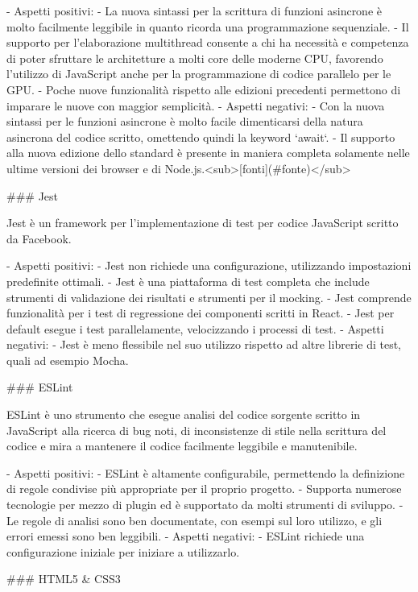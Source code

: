 -   Aspetti positivi:
    -   La nuova sintassi per la scrittura di funzioni asincrone è molto facilmente leggibile in quanto ricorda una programmazione sequenziale.
    -   Il supporto per l'elaborazione multithread consente a chi ha necessità e competenza di poter sfruttare le architetture a molti core delle moderne CPU, favorendo l'utilizzo di JavaScript anche per la programmazione di codice parallelo per le GPU.
    -   Poche nuove funzionalità rispetto alle edizioni precedenti permettono di imparare le nuove con maggior semplicità.
-   Aspetti negativi:
    -   Con la nuova sintassi per le funzioni asincrone è molto facile dimenticarsi della natura asincrona del codice scritto, omettendo quindi la keyword `await`.
    -   Il supporto alla nuova edizione dello standard è presente in maniera completa solamente nelle ultime versioni dei browser e di Node.js.<sub>[fonti](#fonte)</sub>


### Jest

Jest è un framework per l'implementazione di test per codice JavaScript scritto da Facebook.

-   Aspetti positivi:
    -   Jest non richiede una configurazione, utilizzando impostazioni predefinite ottimali.
    -   Jest è una piattaforma di test completa che include strumenti di validazione dei risultati e  strumenti per il mocking.
    -   Jest comprende funzionalità per i test di regressione dei componenti scritti in React.
    -   Jest per default esegue i test parallelamente, velocizzando i processi di test.
-   Aspetti negativi:
    -   Jest è meno flessibile nel suo utilizzo rispetto ad altre librerie di test, quali ad esempio Mocha.

### ESLint

ESLint è uno strumento che esegue analisi del codice sorgente scritto in JavaScript alla ricerca di bug noti, di inconsistenze di stile nella scrittura del codice e mira a mantenere il codice facilmente leggibile e manutenibile.

-   Aspetti positivi:
    -   ESLint è altamente configurabile, permettendo la definizione di regole condivise più appropriate per il proprio progetto.
    -   Supporta numerose tecnologie per mezzo di plugin ed è supportato da molti strumenti di sviluppo.
    -   Le regole di analisi sono ben documentate, con esempi sul loro utilizzo, e gli errori emessi sono ben leggibili.
-   Aspetti negativi:
    -   ESLint richiede una configurazione iniziale per iniziare a utilizzarlo.


### HTML5 & CSS3

